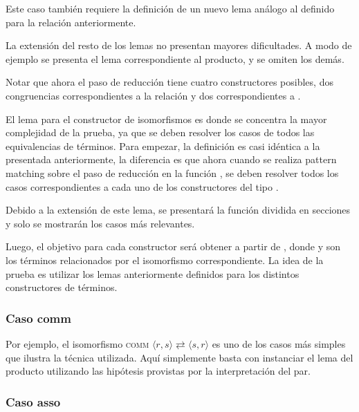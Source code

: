 Este caso también requiere la definición de un nuevo lema análogo al definido para la relación  anteriormente.


La extensión del resto de los lemas no presentan mayores dificultades.
A modo de ejemplo se presenta el lema correspondiente al producto, y se omiten los demás.


Notar que ahora el paso de reducción tiene cuatro constructores posibles, dos congruencias correspondientes a la relación \type{$\hookrightarrow$} y dos correspondientes a \type{$\rightleftarrows$}.

El lema para el constructor de isomorfismos es donde se concentra la mayor complejidad de la prueba, ya que se deben resolver los casos de todos las equivalencias de términos.
Para empezar, la definición es casi idéntica a la presentada anteriormente, la diferencia es que ahora cuando se realiza pattern matching sobre el paso de reducción en la función , se deben resolver todos los casos correspondientes a cada uno de los constructores del tipo .

Debido a la extensión de este lema, se presentará la función  dividida en secciones y solo se mostrarán los casos más relevantes.


Luego, el objetivo para cada constructor será obtener \snstar{} a partir de \snstar{}, donde  y  son los términos relacionados por el isomorfismo correspondiente.
La idea de la prueba es utilizar los lemas anteriormente definidos para los distintos constructores de términos.

\subsubsection{Caso comm}

Por ejemplo, el isomorfismo \textsc{comm} $\langle r,s \rangle \rightleftarrows \langle s,r \rangle$ es uno de los casos más simples que ilustra la técnica utilizada.
Aquí simplemente basta con instanciar el lema del producto utilizando las hipótesis provistas por la interpretación del par.


\subsubsection{Caso asso}

